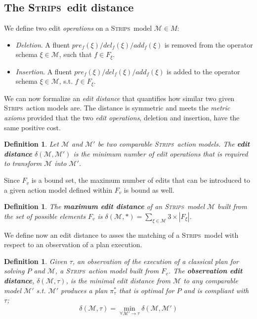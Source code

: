 \documentclass[letterpaper]{article} %
\newcommand{\strips}{\textsc{Strips}}     %
\newtheorem{definition}[theorem]{Definition}
\begin{document}
\subsection{The \strips\ edit distance}
We define two edit \emph{operations} on a \strips\ model $\mathcal{M}\in M$:
\begin{itemize}
\item {\em Deletion}. A fluent $pre_f(\xi)/del_f(\xi)/add_f(\xi)$ is removed from the operator schema $\xi\in\mathcal{M}$, such that $f\in F_{\xi}$.
\item {\em Insertion}. A fluent $pre_f(\xi)/del_f(\xi)/add_f(\xi)$ is added to the operator schema $\xi\in\mathcal{M}$, s.t. $f\in F_{\xi}$.
\end{itemize}

We can now formalize an {\em edit distance} that quantifies how similar two given \strips\ action models are. The distance is symmetric and meets the {\em metric axioms} provided that the two {\em edit operations}, deletion and insertion, have the same positive cost.

\begin{definition}
  Let $\mathcal{M}$ and $\mathcal{M}'$ be two {\em comparable} \strips\ action models. The {\bf edit distance} $\delta(\mathcal{M},\mathcal{M}')$ is the minimum number of {\em edit operations} that is required to transform $\mathcal{M}$ into $\mathcal{M}'$.
\end{definition}

Since $F_v$ is a bound set, the maximum number of edits that can be introduced to a given action model defined within $F_v$ is bound as well. 
\begin{definition}
The \textbf{maximum edit distance} of an \strips\ model $\mathcal{M}$ built from the set of possible elements $F_v$ is $\delta(\mathcal{M},*)=\sum_{\xi\in\mathcal{M}} 3\times|F_{\xi}|$.
\end{definition}

We define now an edit distance to asses the matching of a \strips\ model with respect to an observation of a plan execution. 

\begin{definition}
  Given $\tau$, an observation of the execution of a classical plan for solving $P$ and $\mathcal{M}$, a \strips\ action model built from $F_v$. The {\bf observation edit distance}, $\delta(\mathcal{M},\tau)$, is the minimal edit distance from $\mathcal{M}$ to any {\em comparable} model $\mathcal{M}'$ s.t. $\mathcal{M}'$ produces a plan $\pi^*_\tau$ that is optimal for $P$ and is compliant with $\tau$; \[\delta(\mathcal{M},\tau)=\min_{\forall \mathcal{M}' \rightarrow \tau} \delta(\mathcal{M},\mathcal{M}')\]
\end{definition}
\end{document}
